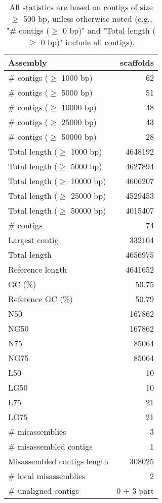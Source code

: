 \documentclass[12pt,a4paper]{article}
\begin{document}
\begin{table}[ht]
\begin{center}
\caption{All statistics are based on contigs of size $\geq$ 500 bp, unless otherwise noted (e.g., "\# contigs ($\geq$ 0 bp)" and "Total length ($\geq$ 0 bp)" include all contigs).}
\begin{tabular}{|l*{1}{|r}|}
\hline
Assembly & scaffolds \\ \hline
\# contigs ($\geq$ 1000 bp) & 62 \\ \hline
\# contigs ($\geq$ 5000 bp) & 51 \\ \hline
\# contigs ($\geq$ 10000 bp) & 48 \\ \hline
\# contigs ($\geq$ 25000 bp) & 43 \\ \hline
\# contigs ($\geq$ 50000 bp) & 28 \\ \hline
Total length ($\geq$ 1000 bp) & 4648192 \\ \hline
Total length ($\geq$ 5000 bp) & 4627894 \\ \hline
Total length ($\geq$ 10000 bp) & 4606207 \\ \hline
Total length ($\geq$ 25000 bp) & 4529453 \\ \hline
Total length ($\geq$ 50000 bp) & 4015407 \\ \hline
\# contigs & 74 \\ \hline
Largest contig & 332104 \\ \hline
Total length & 4656975 \\ \hline
Reference length & 4641652 \\ \hline
GC (\%) & 50.75 \\ \hline
Reference GC (\%) & 50.79 \\ \hline
N50 & 167862 \\ \hline
NG50 & 167862 \\ \hline
N75 & 85064 \\ \hline
NG75 & 85064 \\ \hline
L50 & 10 \\ \hline
LG50 & 10 \\ \hline
L75 & 21 \\ \hline
LG75 & 21 \\ \hline
\# misassemblies & 3 \\ \hline
\# misassembled contigs & 1 \\ \hline
Misassembled contigs length & 308025 \\ \hline
\# local misassemblies & 2 \\ \hline
\# unaligned contigs & 0 + 3 part \\ \hline

\end{tabular}
\end{center}
\end{table}
\end{document}
